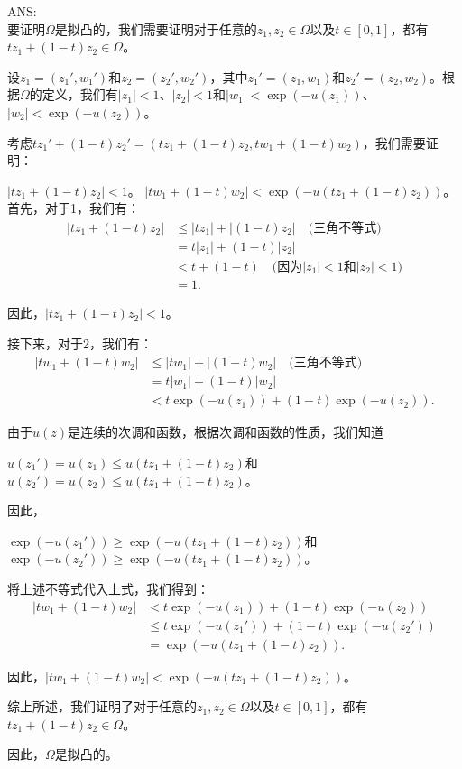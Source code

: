 \documentclass[12pt, a4paper, oneside]{ctexart}
\begin{document}
\begin{spacing}{2.0}
ANS:
\\

要证明$\Omega$是拟凸的，我们需要证明对于任意的$z_1, z_2 \in \Omega$以及$t \in [0,1]$，都有$tz_1 + (1-t)z_2 \in \Omega$。

设$\displaystyle z_1 = (z_1', w_1')$和$z_2 = (z_2', w_2')$，其中$\displaystyle z_1' = (z_1, w_1)$和$z_2' = (z_2, w_2)$。根据$\Omega$的定义，我们有$|z_1| < 1$、$|z_2| < 1$和$|w_1| < \exp(-u(z_1))$、$|w_2| < \exp(-u(z_2))$。

考虑$\displaystyle tz_1' + (1-t)z_2' = (tz_1 + (1-t)z_2, tw_1 + (1-t)w_2)$，我们需要证明：

$\displaystyle |tz_1 + (1-t)z_2| < 1$。
$\displaystyle |tw_1 + (1-t)w_2| < \exp(-u(tz_1 + (1-t)z_2))$。
首先，对于1，我们有：
\begin{align*}
|tz_1 + (1-t)z_2| & \leq |tz_1| + |(1-t)z_2| \quad \text{(三角不等式)} \\
& = t|z_1| + (1-t)|z_2| \\
& < t + (1-t) \quad \text{(因为$|z_1| < 1$和$|z_2| < 1$)} \\
& = 1.
\end{align*}

因此，$|tz_1 + (1-t)z_2| < 1$。

接下来，对于2，我们有：
\begin{align*}
|tw_1 + (1-t)w_2| & \leq |tw_1| + |(1-t)w_2| \quad \text{(三角不等式)} \\
& = t|w_1| + (1-t)|w_2| \\
& < t\exp(-u(z_1)) + (1-t)\exp(-u(z_2)).
\end{align*}

由于$u(z)$是连续的次调和函数，根据次调和函数的性质，我们知道
\begin{center}
    $\displaystyle u(z_1') = u(z_1) \leq u(tz_1 + (1-t)z_2)$和$\displaystyle u(z_2') = u(z_2) \leq u(tz_1 + (1-t)z_2)$。
\end{center}


因此，
\begin{center}
    $\displaystyle \exp(-u(z_1')) \geq \exp(-u(tz_1 + (1-t)z_2))$和$\displaystyle \exp(-u(z_2')) \geq \exp(-u(tz_1 + (1-t)z_2))$。

\end{center}



将上述不等式代入上式，我们得到：
\begin{align*}
|tw_1 + (1-t)w_2| & < t\exp(-u(z_1)) + (1-t)\exp(-u(z_2)) \\
& \leq t\exp(-u(z_1')) + (1-t)\exp(-u(z_2')) \\
& = \exp(-u(tz_1 + (1-t)z_2)).
\end{align*}

因此，$|tw_1 + (1-t)w_2| < \exp(-u(tz_1 + (1-t)z_2))$。

综上所述，我们证明了对于任意的$z_1, z_2 \in \Omega$以及$t \in [0,1]$，都有$tz_1 + (1-t)z_2 \in \Omega$。

因此，$\Omega$是拟凸的。







\end{spacing}{}
\end{document}
